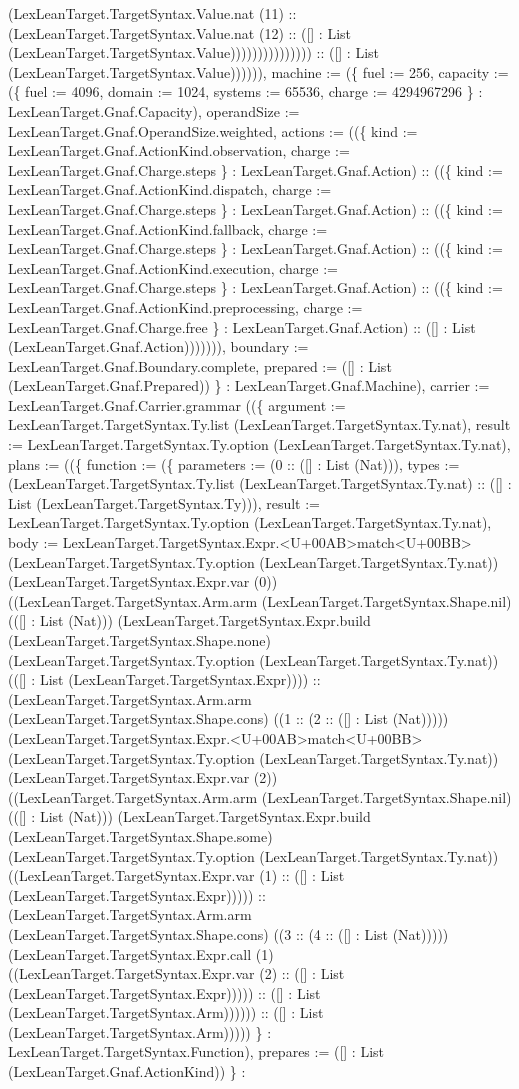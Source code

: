 \documentclass[11pt]{article}
\begin{document}
(LexLeanTarget.TargetSyntax.Value.nat (11) :: (LexLeanTarget.TargetSyntax.Value.nat (12) :: ([] : List (LexLeanTarget.TargetSyntax.Value))))))))))))))) :: ([] : List (LexLeanTarget.TargetSyntax.Value)))))), machine := (\{ fuel := 256, capacity := (\{ fuel := 4096, domain := 1024, systems := 65536, charge := 4294967296 \} : LexLeanTarget.Gnaf.Capacity), operandSize := LexLeanTarget.Gnaf.OperandSize.weighted, actions := ((\{ kind := LexLeanTarget.Gnaf.ActionKind.observation, charge := LexLeanTarget.Gnaf.Charge.steps \} : LexLeanTarget.Gnaf.Action) :: ((\{ kind := LexLeanTarget.Gnaf.ActionKind.dispatch, charge := LexLeanTarget.Gnaf.Charge.steps \} : LexLeanTarget.Gnaf.Action) :: ((\{ kind := LexLeanTarget.Gnaf.ActionKind.fallback, charge := LexLeanTarget.Gnaf.Charge.steps \} : LexLeanTarget.Gnaf.Action) :: ((\{ kind := LexLeanTarget.Gnaf.ActionKind.execution, charge := LexLeanTarget.Gnaf.Charge.steps \} : LexLeanTarget.Gnaf.Action) :: ((\{ kind := LexLeanTarget.Gnaf.ActionKind.preprocessing, charge := LexLeanTarget.Gnaf.Charge.free \} : LexLeanTarget.Gnaf.Action) :: ([] : List (LexLeanTarget.Gnaf.Action))))))), boundary := LexLeanTarget.Gnaf.Boundary.complete, prepared := ([] : List (LexLeanTarget.Gnaf.Prepared)) \} : LexLeanTarget.Gnaf.Machine), carrier := LexLeanTarget.Gnaf.Carrier.grammar ((\{ argument := LexLeanTarget.TargetSyntax.Ty.list (LexLeanTarget.TargetSyntax.Ty.nat), result := LexLeanTarget.TargetSyntax.Ty.option (LexLeanTarget.TargetSyntax.Ty.nat), plans := ((\{ function := (\{ parameters := (0 :: ([] : List (Nat))), types := (LexLeanTarget.TargetSyntax.Ty.list (LexLeanTarget.TargetSyntax.Ty.nat) :: ([] : List (LexLeanTarget.TargetSyntax.Ty))), result := LexLeanTarget.TargetSyntax.Ty.option (LexLeanTarget.TargetSyntax.Ty.nat), body := LexLeanTarget.TargetSyntax.Expr.<U+00AB>match<U+00BB> (LexLeanTarget.TargetSyntax.Ty.option (LexLeanTarget.TargetSyntax.Ty.nat)) (LexLeanTarget.TargetSyntax.Expr.var (0)) ((LexLeanTarget.TargetSyntax.Arm.arm (LexLeanTarget.TargetSyntax.Shape.nil) (([] : List (Nat))) (LexLeanTarget.TargetSyntax.Expr.build (LexLeanTarget.TargetSyntax.Shape.none) (LexLeanTarget.TargetSyntax.Ty.option (LexLeanTarget.TargetSyntax.Ty.nat)) (([] : List (LexLeanTarget.TargetSyntax.Expr)))) :: (LexLeanTarget.TargetSyntax.Arm.arm (LexLeanTarget.TargetSyntax.Shape.cons) ((1 :: (2 :: ([] : List (Nat))))) (LexLeanTarget.TargetSyntax.Expr.<U+00AB>match<U+00BB> (LexLeanTarget.TargetSyntax.Ty.option (LexLeanTarget.TargetSyntax.Ty.nat)) (LexLeanTarget.TargetSyntax.Expr.var (2)) ((LexLeanTarget.TargetSyntax.Arm.arm (LexLeanTarget.TargetSyntax.Shape.nil) (([] : List (Nat))) (LexLeanTarget.TargetSyntax.Expr.build (LexLeanTarget.TargetSyntax.Shape.some) (LexLeanTarget.TargetSyntax.Ty.option (LexLeanTarget.TargetSyntax.Ty.nat)) ((LexLeanTarget.TargetSyntax.Expr.var (1) :: ([] : List (LexLeanTarget.TargetSyntax.Expr))))) :: (LexLeanTarget.TargetSyntax.Arm.arm (LexLeanTarget.TargetSyntax.Shape.cons) ((3 :: (4 :: ([] : List (Nat))))) (LexLeanTarget.TargetSyntax.Expr.call (1) ((LexLeanTarget.TargetSyntax.Expr.var (2) :: ([] : List (LexLeanTarget.TargetSyntax.Expr))))) :: ([] : List (LexLeanTarget.TargetSyntax.Arm)))))) :: ([] : List (LexLeanTarget.TargetSyntax.Arm))))) \} : LexLeanTarget.TargetSyntax.Function), prepares := ([] : List (LexLeanTarget.Gnaf.ActionKind)) \} : 
\end{document}
